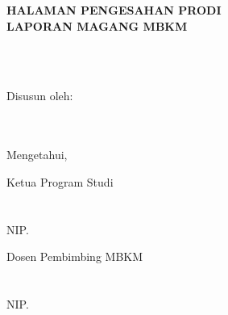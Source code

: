 \newpage


\begin{center}
    \begin{doublespace}
        \textbf{\large \MakeUppercase{Halaman Pengesahan Prodi \\ Laporan Magang MBKM}}
    \end{doublespace}
\end{center}


\begin{center}
    \textbf{\large \MakeUppercase {\normalsize{\judulid}}} \\
    \textbf{\large \MakeUppercase {\normalsize{\tempat}}} \\ [6cm]
\end{center}

\begin{center}
    Disusun oleh:\\
    \textbf{\underline{\penulis}}\\
    \textbf{\nim}\\[3cm]
\end{center}

\begin{center}
    Mengetahui, \\[1cm]
\end{center}
\begin{minipage}{0.45\textwidth}
    Ketua Program Studi\\
    \prodi\\[2cm]
    \underline{\kaprodi}\\
    NIP. \NIPkaprodi
\end{minipage}%
\hfill
 \begin{minipage}{0.42\textwidth}
    Dosen Pembimbing MBKM \\
    \\[2cm]
    \underline{\pembimbing}\\
    NIP. \NIPpembimbing
\end{minipage}